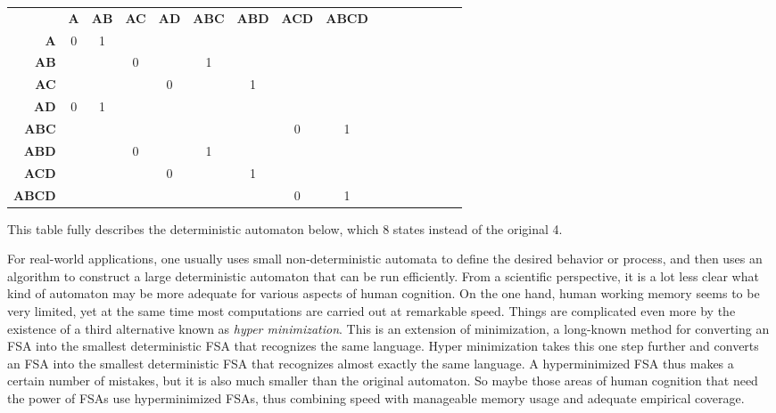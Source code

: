 \begin{examplebox}
    \begin{center}
        \footnotesize
        \begin{tabular}{rccccccccccccccc}
            & \textbf{A} & \textbf{AB} & \textbf{AC} & \textbf{AD} & \textbf{ABC} & \textbf{ABD} & \textbf{ACD} & \textbf{ABCD}\\
            \textbf{A} & 0 & 1\\
            \textbf{AB} & & & 0 & & 1\\
            \textbf{AC} & & & & 0 & & 1\\
            \textbf{AD} & 0 & 1\\ 
            \textbf{ABC} & & & & & & & 0 & 1\\
            \textbf{ABD} & & & 0 & & 1\\
            \textbf{ACD} & & & & 0 & & 1\\
            \textbf{ABCD} & & & & & & & 0 & 1\\
        \end{tabular}
    \end{center}
    This table fully describes the deterministic automaton below, which 8 states instead of the original 4.
    \begin{center}
        
    \end{center}
\end{examplebox}

For real-world applications, one usually uses small non-deterministic automata to define the desired behavior or process, and then uses an algorithm to construct a large deterministic automaton that can be run efficiently.
From a scientific perspective, it is a lot less clear what kind of automaton may be more adequate for various aspects of human cognition.
On the one hand, human working memory seems to be very limited, yet at the same time most computations are carried out at remarkable speed.
Things are complicated even more by the existence of a third alternative known as \emph{hyper minimization}.
This is an extension of minimization, a long-known method for converting an FSA into the smallest deterministic FSA that recognizes the same language.
Hyper minimization takes this one step further and converts an FSA into the smallest deterministic FSA that recognizes almost exactly the same language.
A hyperminimized FSA thus makes a certain number of mistakes, but it is also much smaller than the original automaton.
So maybe those areas of human cognition that need the power of FSAs use hyperminimized FSAs, thus combining speed with manageable memory usage and adequate empirical coverage.

